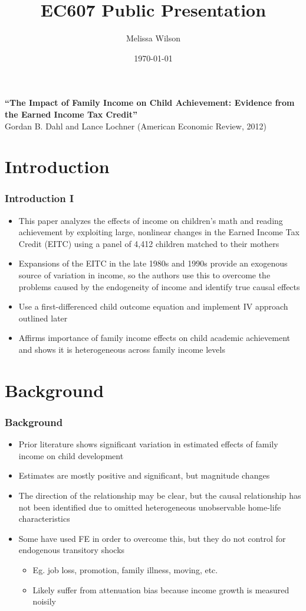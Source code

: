 \documentclass{beamer}
\title{EC607 Public Presentation}
\author{Melissa Wilson}
\institute{University of Oregon}
\date{\today}
\begin{document}
\begin{frame}
\titlepage
\end{frame}

\begin{frame}
\frametitle{}
{\bf ``The Impact of Family Income on Child Achievement: Evidence from the Earned Income Tax Credit''} \\
Gordan B. Dahl and Lance Lochner (American Economic Review, 2012)
\end{frame}


\section{Introduction}


\begin{frame}
\frametitle{Introduction I}
\begin{itemize}
	\item This paper analyzes the effects of income on children's math and reading achievement by exploiting large, nonlinear changes in the Earned Income Tax Credit (EITC) using a panel of 4,412 children matched to their mothers
	\item Expansions of the EITC in the late 1980s and 1990s provide an exogenous source of variation in income, so the authors use this to overcome the problems caused by the endogeneity of income and identify true causal effects
	\item Use a first-differenced child outcome equation and implement IV approach outlined later
	\item Affirms importance of family income effects on child academic achievement and shows it is heterogeneous across family income levels
\end{itemize}
\end{frame}


\section{Background}


\begin{frame}
\frametitle{Background}
\begin{itemize}
	\item Prior literature shows significant variation in estimated effects of family income on child development
	\item Estimates are mostly positive and significant, but magnitude changes
	\item The direction of the relationship may be clear, but the causal relationship has not been identified due to omitted heterogeneous unobservable home-life characteristics 
	\item Some have used FE in order to overcome this, but they do not control for endogenous transitory shocks
	\begin{itemize}
		\item Eg. job loss, promotion, family illness, moving, etc.
		\item Likely suffer from attenuation bias because income growth is measured noisily
	\end{itemize} 
\end{itemize}
\end{frame}
\end{document}
